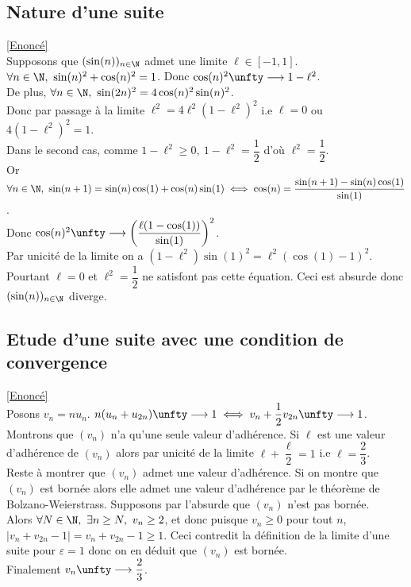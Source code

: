 \documentclass{book}
\begin{document}
	\subsection{Nature d'une suite }
	\label{sec:nature-dune-suite}
	\textcolor{blue}{\hyperref[Nature d'une suite]{[Enoncé]}}\\
	Supposons que $(\sin(n))_{n\in \N}$ admet une limite $\ell\in [-1,1]$.\\
	$\forall n\in \N,\ \sin(n)^2+\cos(n)^2=1$. Donc $\cos(n)^2\unfty\longrightarrow 1-\ell^2$.\\
	De plus, $\forall n\in \N,\ \sin(2n)^2=4\cos(n)^2\sin(n)^2$.\\
	Donc par passage à la limite $\ell^2=4\ell^2(1-\ell^2)^2$ i.e $\ell=0$ ou $4(1-\ell^2)^2=1$.\\
	Dans le second cas, comme $1-\ell^2\geq 0,\ 1-\ell^2=\dfrac{1}{2}$ d'où $\ell^2=\dfrac{1}{2}$.\\
	Or $\forall n\in \N,\ \sin(n+1)=\sin(n)\cos(1)+\cos(n)\sin(1)\iff \cos(n)=\dfrac{\sin(n+1)-\sin(n)\cos(1)}{\sin(1)}$.\\
	Donc $\cos(n)^2\unfty\longrightarrow\left(\dfrac{\ell(1-\cos(1))}{\sin(1)}\right)^2$.\\
	Par unicité de la limite on a $(1-\ell^2)\sin(1)^2=\ell^2(\cos(1)-1)^2$. Pourtant $\ell=0$ et $\ell^2=\dfrac{1}{2}$ ne satisfont pas cette équation.
	Ceci est absurde donc $(\sin(n))_{n\in \N}$ diverge.
	
	\subsection{Etude d'une suite avec une condition de convergence}
	\label{Etude d'une suite avec une condition de convergence corrigé}
	\textcolor{blue}{\hyperref[Etude d'une suite avec une condition de convergence]{[Enoncé]}}\\
	Posons $v_n=nu_n$. $n(u_n+u_{2n})\unfty\longrightarrow 1\iff v_n+\dfrac{1}{2}v_{2n}\unfty\longrightarrow 1$.\\
	Montrons que $(v_n)$ n'a qu'une seule valeur d'adhérence. Si $\ell$ est une valeur d'adhérence de $(v_n)$ alors par unicité de la limite $\ell+\dfrac{\ell}{2}=1$ i.e $\ell=\dfrac{2}{3}$.\\
	Reste à montrer que $(v_n)$ admet une valeur d'adhérence. Si on montre que $(v_n)$ est bornée alors elle admet une valeur d'adhérence par le théorème de Bolzano-Weierstrass. Supposons par l'absurde que $(v_n)$ n'est pas bornée.\\
	Alors $\forall N\in \N,\ \exists n\geq N,\ v_n\geq 2$, et donc puisque $v_n\geq 0$ pour tout $n$, $|v_n+v_{2n}-1|=v_n+v_{2n}-1\geq 1$. Ceci contredit la définition de la limite d'une suite pour $\varepsilon=1$ donc on en déduit que $(v_n)$ est bornée.\\
	Finalement $v_n\unfty\longrightarrow \dfrac{2}{3}$.
	
\end{document}
